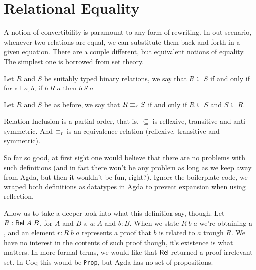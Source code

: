 \section{Relational Equality}

A notion of convertibility is paramount to any form of rewriting. In out scenario, whenever
two relations are equal, we can substitute them back and forth in a given equation. There are
a couple different, but equivalent notions of equality. The simplest one is borrowed from set
theory.\\

\begin{mydef}
Let $R$ and $S$ be suitably typed binary relations, we say that $R \subseteq S$ 
if and only if for all $a , b$, if $b\;R\;a$ then $b\;S\;a$.\\
\end{mydef}

\begin{mydef}
Let $R$ and $S$ be as before, we say that $R \equiv_r S$ if and only if
$R \subseteq S$ and $S \subseteq R$.\\
\end{mydef}

\begin{lemma}
Relation Inclusion is a partial order, that is, $\subseteq$ is reflexive, transitive and anti-symmetric.
And $\equiv_r$ is an equivalence relation (reflexive, transitive and symmetric).\\
\end{lemma}

So far so good, at first sight one would believe that there are no problems with such definitions
(and in fact there won't be any problem as long as we keep away from Agda, but then it wouldn't be fun, right?). 
Ignore the boilerplate code, we wraped both definitions
as datatypes in Agda to prevent expansion when using reflection.


Allow us to take a deeper look into what this definition say, though. 
Let $R : \D{Rel}\;A\;B$, for $A$ and $B$ s, $a : A$ and $b : B$. When we
state $R\;b\;a$ we're obtaining a , and an element $r : R\;b\;a$ represents
a proof that $b$ is related to $a$ trough $R$. We have no interest in the contents of
such proof though, it's existence is what matters. In more formal terms, we would like
that $\D{Rel}$ returned a proof irrelevant set. In Coq this would be \texttt{\small Prop}, but
Agda has no set of propositions.

